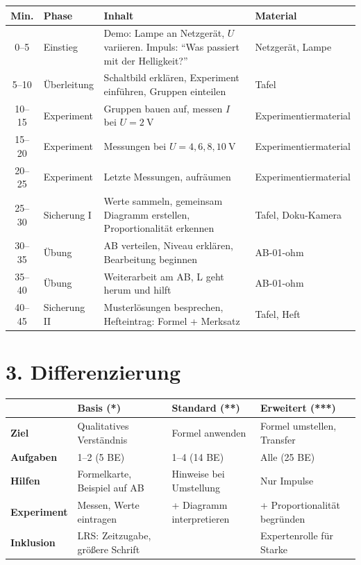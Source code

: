 \documentclass[11pt, a4paper]{article}
\begin{document}
\begin{longtable}{|c|p{3cm}|p{7cm}|p{3cm}|}
\hline
\textbf{Min.} & \textbf{Phase} & \textbf{Inhalt} & \textbf{Material} \\
\hline
\endhead

0--5 & Einstieg & Demo: Lampe an Netzgerät, $U$ variieren. Impuls: ``Was passiert mit der Helligkeit?'' & Netzgerät, Lampe \\
\hline

5--10 & Überleitung & Schaltbild erklären, Experiment einführen, Gruppen einteilen & Tafel \\
\hline

10--15 & Experiment & Gruppen bauen auf, messen $I$ bei $U = \SI{2}{\volt}$ & Experimentiermaterial \\
\hline

15--20 & Experiment & Messungen bei $U = 4, 6, 8, \SI{10}{\volt}$ & Experimentiermaterial \\
\hline

20--25 & Experiment & Letzte Messungen, aufräumen & Experimentiermaterial \\
\hline

25--30 & Sicherung I & Werte sammeln, gemeinsam Diagramm erstellen, Proportionalität erkennen & Tafel, Doku-Kamera \\
\hline

30--35 & Übung & AB verteilen, Niveau erklären, Bearbeitung beginnen & AB-01-ohm \\
\hline

35--40 & Übung & Weiterarbeit am AB, L geht herum und hilft & AB-01-ohm \\
\hline

40--45 & Sicherung II & Musterlösungen besprechen, Hefteintrag: Formel + Merksatz & Tafel, Heft \\
\hline
\end{longtable}


\section*{3. Differenzierung}

\begin{tabular}{|l|p{4cm}|p{4cm}|p{4cm}|}
\hline
& \textbf{Basis (*)} & \textbf{Standard (**)} & \textbf{Erweitert (***)} \\
\hline
\textbf{Ziel} & Qualitatives Verständnis & Formel anwenden & Formel umstellen, Transfer \\
\hline
\textbf{Aufgaben} & 1--2 (5 BE) & 1--4 (14 BE) & Alle (25 BE) \\
\hline
\textbf{Hilfen} & Formelkarte, Beispiel auf AB & Hinweise bei Umstellung & Nur Impulse \\
\hline
\textbf{Experiment} & Messen, Werte eintragen & + Diagramm interpretieren & + Proportionalität begründen \\
\hline
\textbf{Inklusion} & LRS: Zeitzugabe, größere Schrift & & Expertenrolle für Starke \\
\hline
\end{tabular}
\end{document}
